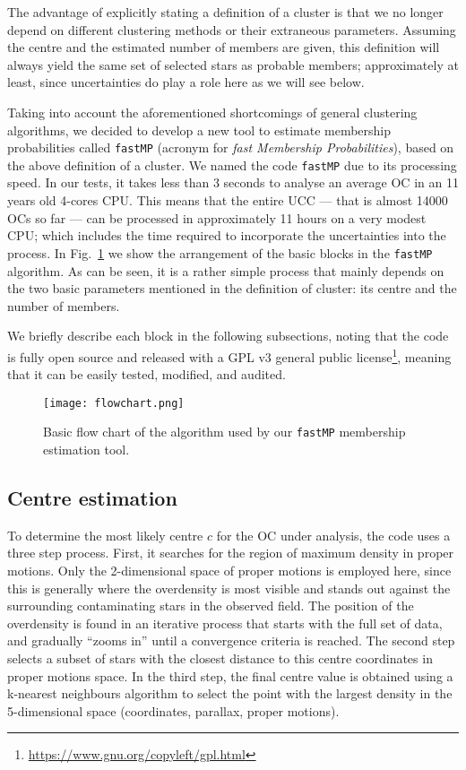 \documentclass[fleqn,usenatbib]{mnras}
\begin{document}
The advantage of explicitly stating a definition of a cluster is that we no
longer depend on different clustering methods or their extraneous parameters.
Assuming the centre and the estimated number of members are given, this
definition will always yield the same set of selected stars as probable members;
approximately at least, since uncertainties do play a role here as we will see
below.

Taking into account the aforementioned shortcomings of general clustering
algorithms, we decided to develop a new tool to estimate membership
probabilities called \texttt{fastMP} (acronym for \emph{fast Membership
Probabilities}), based on the above definition of a cluster.
We named the code \texttt{fastMP} due to its processing speed. In our
tests, it takes less than 3 seconds to analyse an average OC in an 11 years old
4-cores CPU. This means that the entire UCC --- that is almost 14000 OCs so far
--- can be processed in approximately 11 hours on a very modest CPU; which
includes the time required to incorporate the uncertainties into the process.
%
In Fig.~\ref{fig:fastMP_code} we show the arrangement of the basic blocks in
the \texttt{fastMP} algorithm. As can be seen, it is a rather simple process
that mainly depends on the two basic parameters mentioned in the definition of
cluster: its centre and the number of members.

We briefly describe each block in the following subsections, noting that the
code is fully open source and released with a GPL v3 general public
license\footnote{\url{https://www.gnu.org/copyleft/gpl.html}}, meaning that it
can be easily tested, modified, and audited.

\begin{figure}
	\texttt{[image: flowchart.png]}
    \caption{Basic flow chart of the algorithm used by our \texttt{fastMP}
    membership estimation tool.}
    \label{fig:fastMP_code}
\end{figure}


\subsection{Centre estimation}

To determine the most likely centre $c$ for the OC under analysis, the code uses a
three step process. First, it searches for the region of maximum density in
proper motions. Only the 2-dimensional space of proper motions is employed here,
since this is generally where the overdensity is most visible and stands out
against the surrounding contaminating stars in the observed field.
The position of the overdensity is found in an iterative process that starts
with the full set of data, and gradually ``zooms in'' until a convergence
criteria is reached.
The second step selects a subset of stars with the closest distance to this
centre coordinates in proper motions space. In the third step, the final centre
value is obtained using a k-nearest neighbours algorithm to select the point
with the largest density in the 5-dimensional space (coordinates, parallax,
proper motions).
\end{document}

